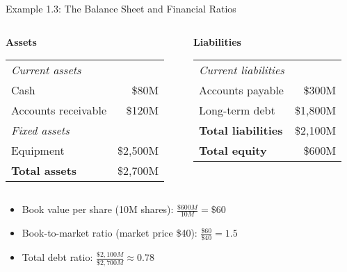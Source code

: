 \documentclass[10pt]{beamer}
\begin{document}
\begin{frame}{Example 1.3: The Balance Sheet and Financial Ratios}
    \small
    \begin{columns}
      \begin{column}{0.48\textwidth}
        \textbf{Assets} \vspace{0.2em}\\
        \begin{tabular}{lr}
          \multicolumn{2}{l}{\textit{Current assets}} \\
          Cash & \$80M \\
          Accounts receivable & \$120M \\[0.5em]
          \multicolumn{2}{l}{\textit{Fixed assets}} \\
          Equipment & \$2,500M \\[0.5em]
          \textbf{Total assets} & \$2,700M \\
        \end{tabular}
      \end{column}
      \begin{column}{0.48\textwidth}
        \textbf{Liabilities} \vspace{0.2em}\\
        \begin{tabular}{lr}
          \multicolumn{2}{l}{\textit{Current liabilities}} \\
          Accounts payable & \$300M \\[0.5em]
          Long-term debt & \$1,800M \\[1.5em]
          \textbf{Total liabilities} & \$2,100M \\
          \textbf{Total equity} & \$600M \\
        \end{tabular}
      \end{column}
    \end{columns}
    
    \pause
    \begin{itemize}
      \item Book value per share (10M shares): $\tfrac{\$600M}{10M} = \$60$
      \item Book-to-market ratio (market price \$40): $\tfrac{\$60}{\$40} = 1.5$
      \item Total debt ratio: $\tfrac{\$2,100M}{\$2,700M} \approx 0.78$
    \end{itemize}
\end{frame}
\end{document}

